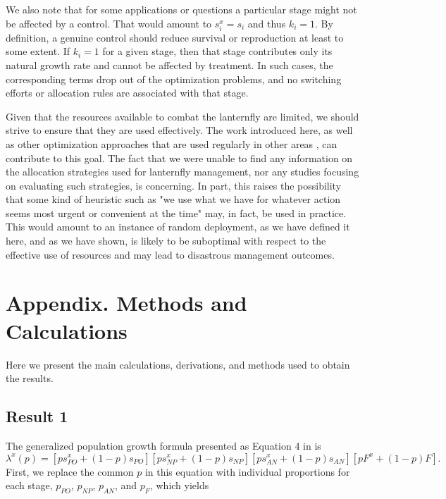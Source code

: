 \documentclass[onecolumn]{article}
\begin{document}
We also note that for some applications or questions a particular stage might not be affected by a control. That would amount to $s^x_i=s_i$ and thus $k_i=1$. By definition, a genuine control should reduce survival or reproduction at least to some extent. If $k_i=1$ for a given stage, then that stage contributes only its natural growth rate and cannot be affected by treatment. In such cases, the corresponding terms drop out of the optimization problems, and no switching efforts or allocation rules are associated with that stage.

Given that the resources available to combat the lanternfly are limited, we should strive to ensure that they are used effectively. The work introduced here, as well as other optimization approaches that are used regularly in other areas \citep{Diwekar2020,Yemshanov2017,Edholm2018}, can contribute to this goal. The fact that we were unable to find any information on the allocation strategies used for lanternfly management, nor any studies focusing on evaluating such strategies, is concerning. In part, this raises the possibility that some kind of heuristic such as "we use what we have for whatever action seems most urgent or convenient at the time" may, in fact, be used in practice. This would amount to an instance of random deployment, as we have defined it here, and as we have shown, is likely to be suboptimal with respect to the effective use of resources and may lead to disastrous management outcomes.

\section*{Appendix. Methods and Calculations}

Here we present the main calculations, derivations, and methods used to obtain the results.

\subsection*{Result 1}
The generalized population growth formula presented as Equation 4 in \citep{Strombom2021} is
\begin{equation}\label{eq:10} \lambda^x(p) = [p s_{PO}^x + (1 - p) s_{PO}][p s_{NP}^x + (1 - p) s_{NP}][p s_{AN}^x + (1 - p) s_{AN}][p F^x + (1 - p) F]. \end{equation}
First, we replace the common $p$ in this equation with individual proportions for each stage, $p_{PO}$, $p_{NP}$, $p_{AN}$, and $p_{F}$, which yields
\end{document}
